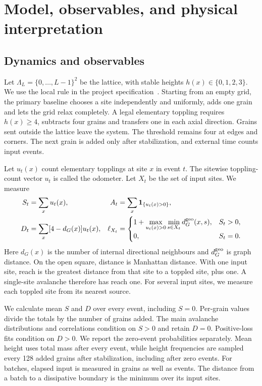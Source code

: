 \chapter{Model, observables, and physical interpretation}\label{sec:model}
\section{Dynamics and observables}\label{sec:observables}
Let $\Lambda_L=\{0,\ldots,L-1\}^2$ be the lattice, with stable heights $h(x)\in\{0,1,2,3\}$. We use the local rule in the project specification~\cite{handout}. Starting from an empty grid, the primary baseline chooses a site independently and uniformly, adds one grain and lets the grid relax completely. A legal elementary toppling requires $h(x)\geq4$, subtracts four grains and transfers one in each axial direction. Grains sent outside the lattice leave the system. The threshold remains four at edges and corners. The next grain is added only after stabilization, and external time counts input events.

Let $u_t(x)$ count elementary topplings at site $x$ in event $t$. The sitewise toppling-count vector $u_t$ is called the odometer. Let $X_t$ be the set of input sites. We measure
\begin{align}
 S_t&=\sum_xu_t(x), & A_t&=\sum_x\mathbf 1_{\{u_t(x)>0\}},\\
 D_t&=\sum_x[4-d_G(x)]u_t(x),&
 \ell_{X_t}&=\begin{cases}1+\displaystyle\max_{u_t(x)>0}\min_{s\in X_t}d_G^{\rm geo}(x,s),&S_t>0,\\0,&S_t=0.\end{cases}
 \label{eq:observables}
\end{align}
Here $d_G(x)$ is the number of internal directional neighbours and $d_G^{\rm geo}$ is graph distance. On the open square, distance is Manhattan distance. With one input site, reach is the greatest distance from that site to a toppled site, plus one. A single-site avalanche therefore has reach one. For several input sites, we measure each toppled site from its nearest source.

We calculate mean $S$ and $D$ over every event, including $S=0$. Per-grain values divide the totals by the number of grains added. The main avalanche distributions and correlations condition on $S>0$ and retain $D=0$. Positive-loss fits condition on $D>0$. We report the zero-event probabilities separately. Mean height uses total mass after every event, while height frequencies are sampled every 128 added grains after stabilization, including after zero events. For batches, elapsed input is measured in grains as well as events. The distance from a batch to a dissipative boundary is the minimum over its input sites.


